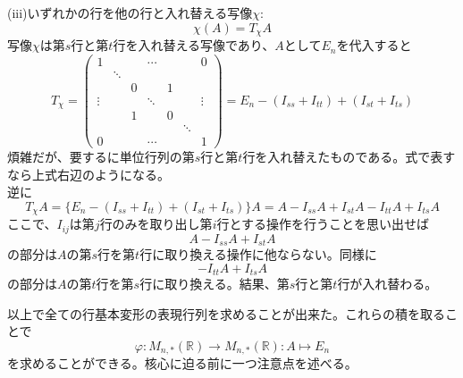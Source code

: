 \documentclass[dvipdfmx]{jsarticle}
\begin{document}
(iii)いずれかの行を他の行と入れ替える写像$\chi:$
\[\chi(A)=T_\chi A\]
写像$\chi$は第$s$行と第$t$行を入れ替える写像であり、$A$として$E_n$を代入すると
\[T_\chi=\begin{pmatrix}1&{}&{}&\cdots&{}&{}&0\\{}&\ddots&{}&{}&{}&{}&{}\\{}&{}&0&{}&1&{}&{}\\\vdots&{}&{}&\ddots&{}&{}&\vdots\\{}&{}&1&{}&0&{}&{}\\{}&{}&{}&{}&{}&\ddots&{}\\0&{}&{}&\cdots&{}&{}&1\end{pmatrix}=E_n-(I_{ss}+I_{tt})+(I_{st}+I_{ts})\]
煩雑だが、要するに単位行列の第$s$行と第$t$行を入れ替えたものである。式で表すなら上式右辺のようになる。\\
逆に
\[T_{\chi}A=\{E_n-(I_{ss}+I_{tt})+(I_{st}+I_{ts})\}A=A-I_{ss}A+I_{st}A-I_{tt}A+I_{ts}A\]
ここで、$I_{ij}$は第$j$行のみを取り出し第$i$行とする操作を行うことを思い出せば
\[A-I_{ss}A+I_{st}A\]
の部分は$A$の第$s$行を第$t$行に取り換える操作に他ならない。同様に
\[-I_{tt}A+I_{ts}A\]
の部分は$A$の第$t$行を第$s$行に取り換える。結果、第$s$行と第$t$行が入れ替わる。\\\par
以上で全ての行基本変形の表現行列を求めることが出来た。これらの積を取ることで
\[\varphi:M_{n,\ast}(\mathbb{R}) \to M_{n,\ast}(\mathbb{R}):A \mapsto E_n\]
を求めることができる。核心に迫る前に一つ注意点を述べる。\newpage
\end{document}
